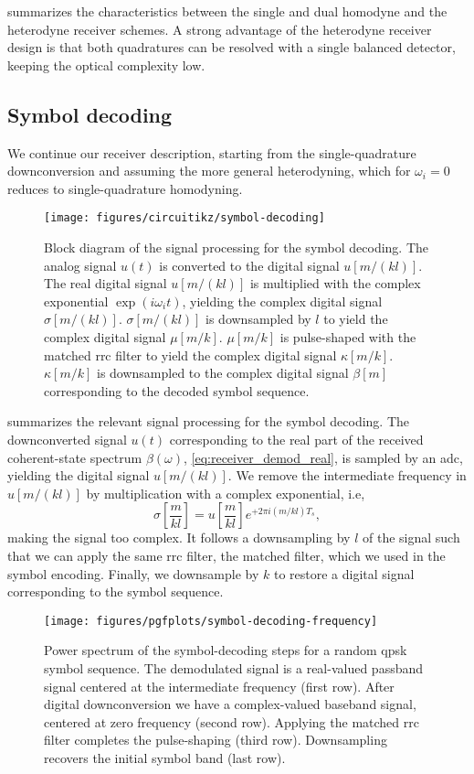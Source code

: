  summarizes the characteristics between the single and dual homodyne and the heterodyne receiver schemes.
A strong advantage of the heterodyne receiver design is that both quadratures can be resolved with a single balanced detector, keeping the optical complexity low.

\FloatBarrier
\subsection{Symbol decoding}

We continue our receiver description, starting from the single-quadrature downconversion and assuming the more general heterodyning, which for $\omega_i=0$ reduces to single-quadrature homodyning.
\begin{figure}[htb]
	\centering
	\texttt{[image: figures/circuitikz/symbol-decoding]}
	\caption{Block diagram of the signal processing for the symbol decoding. The analog signal $u(t)$ is converted to the digital signal $u[m/(kl)]$. The real digital signal $u[m/(kl)]$ is multiplied with the complex exponential $\exp(i\omega_it)$, yielding the complex digital signal $\sigma[m/(kl)]$. $\sigma[m/(kl)]$ is downsampled by $l$ to yield the complex digital signal $\mu[m/k]$. $\mu[m/k]$ is pulse-shaped with the matched \gls{rrc} filter to yield the complex digital signal $\kappa[m/k]$. $\kappa[m/k]$ is downsampled to the complex digital signal $\beta[m]$ corresponding to the decoded symbol sequence.}\label{fig:symbol_decoding_blocks}
\end{figure}
 summarizes the relevant signal processing for the symbol decoding.
The downconverted signal $u(t)$ corresponding to the real part of the received coherent-state spectrum $\beta(\omega)$, \cref{eq:receiver_demod_real}, is sampled by an \gls{adc}, yielding the digital signal $u[m/(kl)]$.
We remove the intermediate frequency in $u[m/(kl)]$ by multiplication with a complex exponential, i.e,
\begin{equation}
	\sigma\left[\frac{m}{kl}\right]
	=
	u\left[\frac{m}{kl}\right]
	e^{+2\pi i (m/kl) T_s}
	,
\end{equation}
making the signal too complex.
It follows a downsampling by $l$ of the signal such that we can apply the same \gls{rrc} filter, the matched filter, which we used in the symbol encoding.
Finally, we downsample by $k$ to restore a digital signal corresponding to the symbol sequence.
\begin{figure}[htb]
	\centering
	\texttt{[image: figures/pgfplots/symbol-decoding-frequency]}
	\caption{Power spectrum of the symbol-decoding steps for a random \gls{qpsk} symbol sequence. The demodulated signal is a real-valued passband signal centered at the intermediate frequency (first row). After digital downconversion we have a complex-valued baseband signal, centered at zero frequency (second row). Applying the matched \gls{rrc} filter completes the pulse-shaping (third row). Downsampling recovers the initial symbol band (last row).}\label{fig:symbol_decoding_frequency}
\end{figure}
